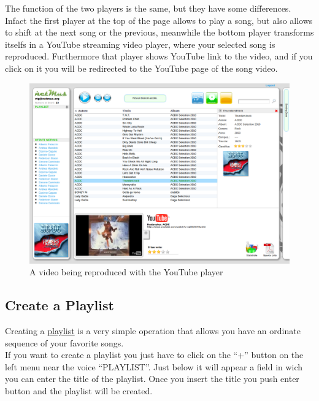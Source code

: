 The function of the two players is the same, but they have some differences.
Infact the first player at the top of the page allows to play a song, but also
allows to shift at the next song or the previous, meanwhile the bottom player
transforms itselfs in a YouTube streaming video player, where your selected song
is reproduced. Furthermore that player shows YouTube link to the video, and if
you click on it you will be redirected to the YouTube page of the song video.\\


\begin{figure}[htbp]
  \centering
  \includegraphics[width=15cm]{img/MU/player_youtube.png}
\caption{A video being reproduced with the YouTube player}
\end{figure} 

\subsection*{Create a Playlist}

Creating a \underline{playlist} is a very simple operation that allows you have
an ordinate sequence of your favorite songs.\\
If you want to create a playlist you just have to click on the ``+'' button on
the left menu near the voice ``PLAYLIST''. Just below it will appear a field in
wich you can enter the title of the playlist. Once you insert the title you push
enter button and the playlist will be created.\\

